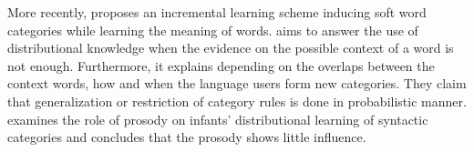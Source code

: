 More recently, \cite{alishahi2012concurrent} proposes an incremental learning
scheme inducing soft word categories while learning the meaning of words. 
\cite{reeder2013shared} aims to answer the use of distributional knowledge
when the evidence on  the possible context of a word is not enough. Furthermore,
it explains depending on the overlaps between the context words, how and 
when the language users form new categories. They claim that generalization
or restriction of category rules is done in probabilistic manner. \cite{thothathiri2012effect}
examines the role of prosody on infants' distributional learning of
syntactic categories and concludes that the prosody shows little
influence.
